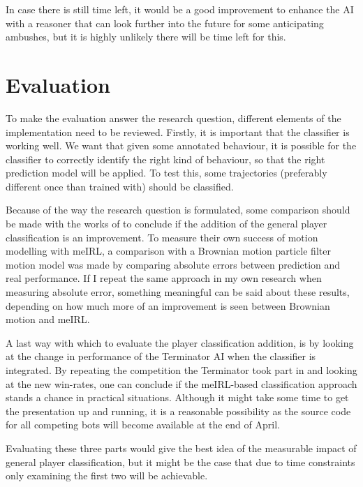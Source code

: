 \documentclass[a4paper, 12pt]{article}
\begin{document}
In case there is still time left, it would be a good improvement to enhance the
AI with a reasoner that can look further into the future for some anticipating
ambushes, but it is highly unlikely there will be time left for this.


\section{Evaluation}
To make the evaluation answer the research question, different elements of
the implementation need to be reviewed. 
Firstly, it is important that the classifier is working well. We want that
given some annotated behaviour, it is possible for the classifier to correctly
identify the right kind of behaviour, so that the right prediction model will
be applied.
To test this, some trajectories (preferably different once than trained
with) should be classified. 

Because of the way the research question is formulated, some comparison
should be made with the works of \citep{6374144} to conclude if the addition of
the general player classification is an improvement.
To measure their own success of motion modelling with meIRL, a comparison with a Brownian motion
particle filter motion model was made by comparing absolute errors between
prediction and real performance. If I repeat the same approach in my own
research when measuring absolute error, something meaningful can be said about
these results, depending on how much more of an improvement is seen between
Brownian motion and meIRL.

A last way with which to evaluate the player classification addition, is by
looking at the change in performance of the Terminator AI when the classifier is
integrated. By repeating the competition the Terminator took part in and looking
at the new win-rates, one can conclude if the meIRL-based classification
approach stands a chance in practical situations. Although it might take some
time to get the presentation up and running, it is a reasonable possibility
as the source code for all competing bots will become available at the end of April.

Evaluating these three parts would give the best idea of the
measurable impact of general player classification, but it might be the case
that due to time constraints only examining the first two will be achievable.

\FloatBarrier

\end{document}
